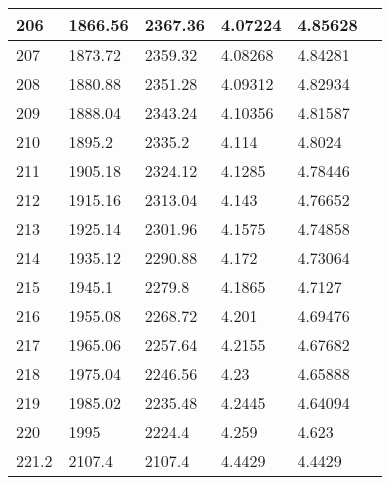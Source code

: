 \documentclass[twocolumn]{article}
\begin{document}
\begin{tabular}{l|l|l|l|l|l}
206	&	1866.56	&	2367.36	&	4.07224	&	4.85628 \\ \hline
207	&	1873.72	&	2359.32	&	4.08268	&	4.84281 \\ \hline
208	&	1880.88	&	2351.28	&	4.09312	&	4.82934 \\ \hline
209	&	1888.04	&	2343.24	&	4.10356	&	4.81587 \\ \hline
210	&	1895.2	&	2335.2	&	4.114	&	4.8024 \\ \hline
211	&	1905.18	&	2324.12	&	4.1285	&	4.78446 \\ \hline
212	&	1915.16	&	2313.04	&	4.143	&	4.76652 \\ \hline
213	&	1925.14	&	2301.96	&	4.1575	&	4.74858 \\ \hline
214	&	1935.12	&	2290.88	&	4.172	&	4.73064 \\ \hline
215	&	1945.1	&	2279.8	&	4.1865	&	4.7127 \\ \hline
216	&	1955.08	&	2268.72	&	4.201	&	4.69476 \\ \hline
217	&	1965.06	&	2257.64	&	4.2155	&	4.67682 \\ \hline
218	&	1975.04	&	2246.56	&	4.23	&	4.65888 \\ \hline
219	&	1985.02	&	2235.48	&	4.2445	&	4.64094 \\ \hline
220	&	1995	&	2224.4	&	4.259	&	4.623 \\ \hline
221.2	&	2107.4	&	2107.4	&	4.4429	&	4.4429 \\ 
\end{tabular}
\end{document}
